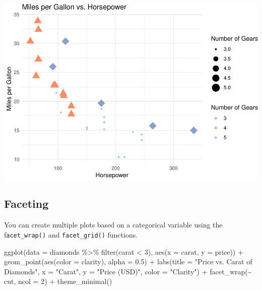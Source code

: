 \documentclass[
]{book}
\newenvironment{Shaded}{\begin{snugshade}}{\end{snugshade}}
\newcommand{\AttributeTok}[1]{\textcolor[rgb]{0.77,0.63,0.00}{#1}}
\newcommand{\DecValTok}[1]{\textcolor[rgb]{0.00,0.00,0.81}{#1}}
\newcommand{\FloatTok}[1]{\textcolor[rgb]{0.00,0.00,0.81}{#1}}
\newcommand{\FunctionTok}[1]{\textcolor[rgb]{0.00,0.00,0.00}{#1}}
\newcommand{\NormalTok}[1]{#1}
\newcommand{\SpecialCharTok}[1]{\textcolor[rgb]{0.00,0.00,0.00}{#1}}
\newcommand{\StringTok}[1]{\textcolor[rgb]{0.31,0.60,0.02}{#1}}
\begin{document}
\includegraphics[width=1\linewidth]{graphformatting_files/figure-latex/unnamed-chunk-5-1}

\hypertarget{faceting}{%
\subsection{Faceting}\label{faceting}}

You can create multiple plots based on a categorical variable using the f\texttt{acet\_wrap()} and \texttt{facet\_grid()} functions.

\begin{Shaded}
\begin{Highlighting}[]
\FunctionTok{ggplot}\NormalTok{(}\AttributeTok{data =}\NormalTok{ diamonds }\SpecialCharTok{\%\textgreater{}\%} \FunctionTok{filter}\NormalTok{(carat }\SpecialCharTok{\textless{}} \DecValTok{3}\NormalTok{), }\FunctionTok{aes}\NormalTok{(}\AttributeTok{x =}\NormalTok{ carat, }\AttributeTok{y =}\NormalTok{ price)) }\SpecialCharTok{+}
  \FunctionTok{geom\_point}\NormalTok{(}\FunctionTok{aes}\NormalTok{(}\AttributeTok{color =}\NormalTok{ clarity), }\AttributeTok{alpha =} \FloatTok{0.5}\NormalTok{) }\SpecialCharTok{+}
  \FunctionTok{labs}\NormalTok{(}\AttributeTok{title =} \StringTok{"Price vs. Carat of Diamonds"}\NormalTok{,}
       \AttributeTok{x =} \StringTok{"Carat"}\NormalTok{,}
       \AttributeTok{y =} \StringTok{"Price (USD)"}\NormalTok{,}
       \AttributeTok{color =} \StringTok{"Clarity"}\NormalTok{) }\SpecialCharTok{+}
  \FunctionTok{facet\_wrap}\NormalTok{(}\SpecialCharTok{\textasciitilde{}}\NormalTok{ cut, }\AttributeTok{ncol =} \DecValTok{2}\NormalTok{) }\SpecialCharTok{+}
  \FunctionTok{theme\_minimal}\NormalTok{()}
\end{Highlighting}
\end{Shaded}
\end{document}
